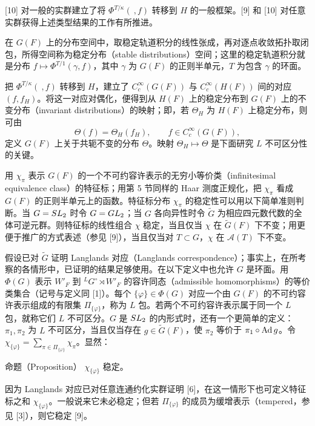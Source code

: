 [10] 对一般的实群建立了将 $\Phi^{T/\kappa}(\ ,f)$ 转移到 $H$ 的一般框架。[9] 和 [10] 对任意实群获得上述类型结果的工作有所推进。

在 $G(F)$ 上的分布空间中，取稳定轨道积分的线性张成，再对逐点收敛拓扑取闭包，所得空间称为稳定分布（stable distributions）空间；这里的稳定轨道积分就是分布
$f\mapsto\Phi^{T/1}(\gamma,f)$，其中 $\gamma$ 为 $G(F)$ 的正则半单元，$T$ 为包含 $\gamma$ 的环面。

把 $\Phi^{T/\kappa}(\ ,f)$ 转移到 $H$，建立了
$C_c^\infty(G(F))$ 与 $C_c^\infty(H(F))$ 间的对应 $(f,f_H)$。将这一对应对偶化，便得到从 $H(F)$ 上的稳定分布到 $G(F)$ 上的不变分布（invariant distributions）的映射；即，若 $\Theta_H$ 为 $H(F)$ 上稳定分布，则可由
\[
\Theta(f)=\Theta_H(f_H),\qquad f\in C_c^\infty(G(F)),
\]
定义 $G(F)$ 上关于共轭不变的分布 $\Theta$。映射 $\Theta_H\mapsto\Theta$ 是下面研究 $L$ 不可区分性的关键。

用 $\chi_\pi$ 表示 $G(F)$ 的一个不可约容许表示的无穷小等价类（infinitesimal equivalence class）的特征标；用第 5 节同样的 Haar 测度正规化，把 $\chi_\pi$ 看成 $G(F)$ 的正则半单元上的函数。特征标分布 $\chi_\pi$ 的稳定性可以用以下简单准则判断。当 $G=SL_2$ 时令 $G=GL_2$；当 $G$ 各向异性时令 $\widetilde G$ 为相应四元数代数的全体可逆元群。则特征标的线性组合 $\chi$ 稳定，当且仅当 $\chi$ 在 $\widetilde G(F)$ 下不变；用更便于推广的方式表述（参见 [9]），当且仅当对 $T\subset G$，$\chi$ 在 $\mathcal A(T)$ 下不变。

假设已对 $\widetilde G$ 证明 Langlands 对应（Langlands correspondence）；事实上，在所考察的各情形中，已证明的结果足够使用。在以下定义中也允许 $G$ 是环面。用 $\Phi(G)$ 表示 $W'_F$ 到 ${}^LG^\circ\rtimes W'_F$ 的容许同态（admissible homomorphisms）的等价类集合（记号与定义同 [1]）。每个 $\{\varphi\}\in\Phi(G)$ 对应一个由 $G(F)$ 的不可约容许表示组成的有限集 $\Pi_{\{\varphi\}}$，称为 $L$ 包。若两个不可约容许表示属于同一个 $L$ 包，就称它们 $L$ 不可区分。$G$ 是 $SL_2$ 的内形式时，还有一个更简单的定义：$\pi_1,\pi_2$ 为 $L$ 不可区分，当且仅当存在 $g\in\widetilde G(F)$，使 $\pi_2$ 等价于 $\pi_1\circ\operatorname{Ad} g$。令
$\chi_{\{\varphi\}}=\sum_{\pi\in\Pi_{\{\varphi\}}}\chi_\pi$。显然：
\begin{originaltheorem}{命题（Proposition）}
$\chi_{\{\varphi\}}$ 稳定。
\end{originaltheorem}

因为 Langlands 对应已对任意连通约化实群证明 [6]，在这一情形下也可定义特征标之和 $\chi_{\{\varphi\}}$。一般说来它未必稳定；但若 $\Pi_{\{\varphi\}}$ 的成员为缓增表示（tempered，参见 [3]），则它稳定 [9]。

